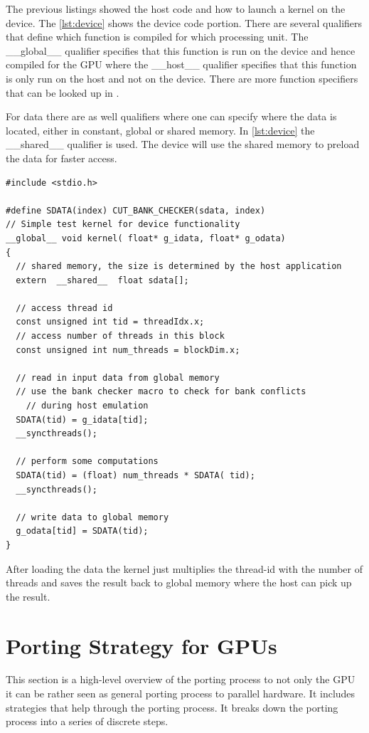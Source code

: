 The previous listings showed the host code and how to launch a kernel on the
device. The \autoref{lst:device} shows the device code portion. There are
several qualifiers that define which function is compiled for which processing
unit. The \textsf{\_\_global\_\_} qualifier specifies that this function is run
on the device and hence compiled for the \gls{GPU} where the
\textsf{\_\_host\_\_} qualifier specifies that this function is only run on the
host and not on the device. There are more function specifiers that can be
looked up in \citep{citeulike:3325943}.

For data there are as well qualifiers where one can specify where the data is
located, either in constant, global or shared memory. In \autoref{lst:device}
the \textsf{\_\_shared\_\_} qualifier is used. The device will use the shared
memory to preload the data for faster access.

\begin{lstlisting}[caption=CUDA device code, label=lst:device]
#include <stdio.h>

#define SDATA(index) CUT_BANK_CHECKER(sdata, index)
// Simple test kernel for device functionality
__global__ void kernel( float* g_idata, float* g_odata) 
{
  // shared memory, the size is determined by the host application
  extern  __shared__  float sdata[];

  // access thread id 
  const unsigned int tid = threadIdx.x;
  // access number of threads in this block 
  const unsigned int num_threads = blockDim.x;

  // read in input data from global memory
  // use the bank checker macro to check for bank conflicts
 	// during host emulation 
  SDATA(tid) = g_idata[tid];
  __syncthreads();

  // perform some computations 
  SDATA(tid) = (float) num_threads * SDATA( tid);
  __syncthreads();

  // write data to global memory 
  g_odata[tid] = SDATA(tid);
} 
\end{lstlisting} 


After loading the data the kernel just multiplies the thread-id with the number
of threads and saves the result back to global memory where the host can pick up
the result.

\section{Porting Strategy for GPUs}%
\label{sec:porting_strategies_for_gpu} 
This section  is a high-level overview of the porting process to not only
the \gls{GPU} it can be rather seen as general porting process to parallel 
hardware. It includes strategies that help through the porting process. It 
breaks down the porting process into a series of discrete steps. 

